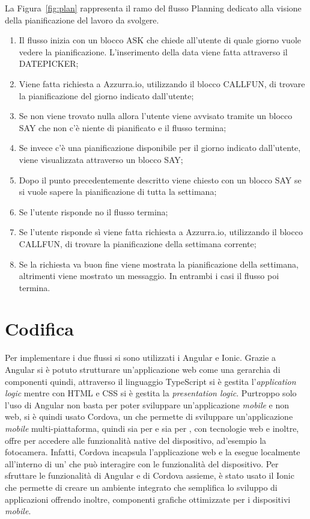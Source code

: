 La Figura~\ref{fig:plan} rappresenta il ramo del flusso Planning dedicato alla visione della pianificazione del lavoro da svolgere.
\begin{enumerate}
	\item Il flusso inizia con un blocco ASK che chiede all'utente di quale giorno vuole vedere la pianificazione. L'inserimento della data viene fatta attraverso il DATEPICKER;
	\item Viene fatta richiesta a Azzurra.io, utilizzando il blocco CALLFUN, di trovare la pianificazione del giorno indicato dall'utente;
	\item Se non viene trovato nulla allora l'utente viene avvisato tramite un blocco SAY che non c'è niente di pianificato e il flusso termina;
	\item Se invece c'è una pianificazione disponibile per il giorno indicato dall'utente, viene visualizzata attraverso un blocco SAY;
	\item Dopo il punto precedentemente descritto viene chiesto con un blocco SAY se si vuole sapere la pianificazione di tutta la settimana;
	\item Se l'utente risponde no il flusso termina;
	\item Se l'utente risponde sì viene fatta richiesta a Azzurra.io, utilizzando il blocco CALLFUN, di trovare la pianificazione della settimana corrente;
	\item Se la richiesta va buon fine viene mostrata la pianificazione della settimana, altrimenti viene mostrato un messaggio. In entrambi i casi il flusso poi termina.
\end{enumerate}
\clearpage

\section{Codifica}
Per implementare i due flussi si sono utilizzati i  Angular e Ionic. Grazie a Angular si è potuto strutturare un’applicazione web come una gerarchia di componenti quindi, attraverso il linguaggio TypeScript si è gestita l'\emph{application logic} mentre con \gls{HTML} e \gls{CSS} si è gestita la \emph{presentation logic}. Purtroppo solo l'uso di Angular non basta per poter sviluppare un'applicazione \emph{mobile} e non web, si è quindi usato Cordova, un  che permette di sviluppare un'applicazione \emph{mobile} multi-piattaforma, quindi sia per  e sia per , con tecnologie web e inoltre, offre  per accedere alle funzionalità native del dispositivo, ad'esempio la fotocamera. Infatti, Cordova incapsula l'applicazione web e la esegue localmente all’interno di un’ che può interagire con le funzionalità del dispositivo. Per sfruttare le funzionalità di Angular e di Cordova assieme, è stato usato il  Ionic che permette di creare un ambiente integrato che semplifica lo sviluppo di applicazioni offrendo inoltre, componenti grafiche ottimizzate per i dispositivi \emph{mobile}.\\

